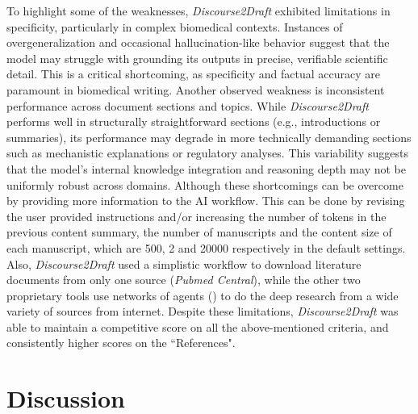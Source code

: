 \documentclass[utf8]{FrontiersinHarvard} %
\newcommand{\appname}{\emph{Discourse2Draft}}
\newcommand{\maxTokensSummarization}{500}
\newcommand{\maxContentSizePerLiterature}{20000}
\newcommand{\maxNumLiterature}{2}
\begin{document}
To highlight some of the weaknesses, \appname{} exhibited limitations in specificity, particularly in complex biomedical contexts. Instances of overgeneralization and occasional hallucination-like behavior suggest that the model may struggle with grounding its outputs in precise, verifiable scientific detail. This is a critical shortcoming, as specificity and factual accuracy are paramount in biomedical writing. Another observed weakness is inconsistent performance across document sections and topics. While \appname{} performs well in structurally straightforward sections (e.g., introductions or summaries), its performance may degrade in more technically demanding sections such as mechanistic explanations or regulatory analyses. This variability suggests that the model's internal knowledge integration and reasoning depth may not be uniformly robust across domains. Although these shortcomings can be overcome by providing more information to the AI workflow. This can be done by revising the user provided instructions and/or increasing the number of tokens in the previous content summary, the number of manuscripts and the content size of each manuscript, which are \maxTokensSummarization{}, \maxNumLiterature{} and \maxContentSizePerLiterature{} respectively in the default settings. Also, \appname{} used a simplistic workflow to download literature documents from only one source (\emph{Pubmed Central}), while the other two proprietary tools use networks of agents (\citep{deepresearch2025openai, shen2025mind}) to do the deep research from a wide variety of sources from internet. Despite these limitations, \appname{} was able to maintain a competitive score on all the above-mentioned criteria, and consistently higher scores on the ``References".

\section{Discussion}
\end{document}
